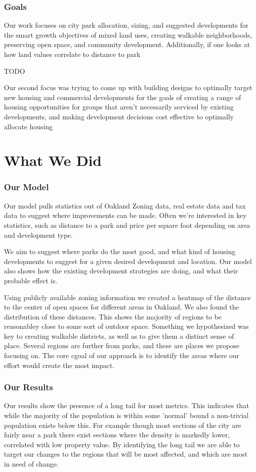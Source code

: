 \documentclass[]{report}
\begin{document}
	\section{Goals}
	Our work focuses on city park allocation, sizing, and suggested developments for the smart growth objectives of mixed land uses, creating walkable neighborhoods, preserving open space, and community development. Additionally, if one looks at how land values correlate to distance to park
	
	TODO
	
	Our second focus was trying to come up with building designs to optimally target new housing and commercial developments for the goals of creating a range of housing opportunities for groups that aren't necessarily serviced by existing developments, and making development decisions cost effective to optimally allocate housing
	
	
\part{What We Did}
	\section{Our Model}
	Our model pulls statistics out of Oakland Zoning data, real estate data and tax data to suggest where improvements can be made. Often we're interested in key statistics, such as distance to a park and price per square foot depending on area and development type.
	
	We aim to suggest where parks do the most good, and what kind of housing developments to suggest for a given desired development and location. Our model also shows how the existing development strategies are doing, and what their probable effect is.
	
	Using publicly available zoning information we created a heatmap of the distance to the center of open spaces for different areas in Oakland. We also found the distribution of these distances. This shows the majority of regions to be reasonabley close to some sort of outdoor space. Something we hypothesized was key to creating walkable districts, as well as to give them a distinct sense of place. Several regions are further from parks, and these are places we propose focusing on. The core cgoal of our approach is to identify the areas where our effort would create the most impact. 
	
	\section{Our Results}
	Our results show the presence of a long tail for most metrics. This indicates that while the majority of the population is within some 'normal' bound a non-trivial population exists below this. For example though most sections of the city are fairly near a park there exist sections where the density is markedly lower, correlated with low property value. By identifying the long tail we are able to target our changes to the regions that will be most affected, and which are most in need of change. 
	
\end{document}
